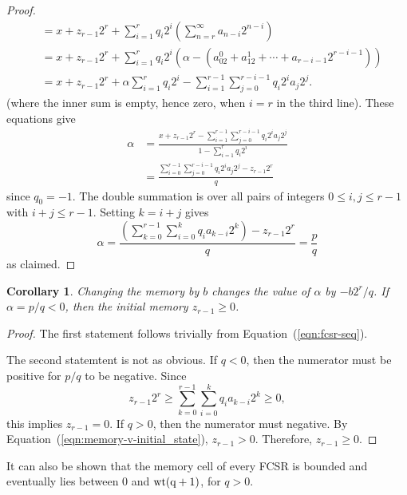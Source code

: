 \documentclass[english]{article}
\theoremstyle{plain}
\newtheorem{corollary}[theorem]{Corollary}%
\theoremstyle{definition}
\theoremstyle{remark}
\begin{document}
\begin{proof}
\begin{align*}
          &=x+z_{r-1}2^r+\sum_{i=1}^r{q_i2^i}\left(\sum_{n=r}^\infty a_{n-i}2^{n-i}\right)\\
          &=x+z_{r-1}2^r+\sum_{i=1}^r{q_i2^i}(\alpha-(a_02^0+a_12^1+\cdots+a_{r-i-1}2^{r-i-1}))\\
          &=x+z_{r-1}2^r+\alpha\sum_{i=1}^r{q_i2^i}-\sum_{i=1}^{r-1}\sum_{j=0}^{r-i-1}q_i2^ia_j2^j.
  \end{align*}
  (where the inner sum is empty, hence zero, when $i=r$ in the third line).
  These equations give
  \begin{align*}
    \alpha&=\frac{x+z_{r-1}2^r-\sum_{i=1}^{r-1}\sum_{j=0}^{r-i-1}q_i2^ia_j2^j}
                {1-\sum_{i=1}^r q_i2^i}\\
          &=\frac{\sum_{i=0}^{r-1}\sum_{j=0}^{r-i-1}q_i2^ia_j2^j-z_{r-1}2^r}{q}
  \end{align*}
  since $q_0=-1$. The double summation is over all pairs of integers $0\leq i,j
  \leq r-1$ with $i+j\leq r-1$. Setting $k=i+j$ gives
  \begin{equation}\label{eqn:fcsr-seq}
    \alpha=\frac{\left(\sum_{k=0}^{r-1}\sum_{i=0}^kq_ia_{k-i}2^k\right)-z_{r-1}2^r}{q}
          =\frac{p}{q}
  \end{equation}
  as claimed.
\end{proof}

\begin{corollary}
  \par Changing the memory by $b$ changes the value of $\alpha$ by $-b2^r/q$. If
  $\alpha=p/q<0$, then the initial memory $z_{r-1}\geq 0$.
\end{corollary}
\begin{proof}
  \par The first statement follows trivially from Equation~(\ref{eqn:fcsr-seq}).
  \par The second statemtent is not as obvious. If $q<0$, then the numerator
  must be positive for $p/q$ to be negative. Since
  \begin{equation}\label{eqn:memory-v-initial_state}
    z_{r-1}2^r\geq\sum_{k=0}^{r-1}\sum_{i=0}^kq_ia_{k-i}2^k\geq0,
  \end{equation}
  this implies $z_{r-1}=0$. If $q>0$, then the numerator must negative.
  By Equation~(\ref{eqn:memory-v-initial_state}), $z_{r-1}>0$. Therefore,
  $z_{r-1}\geq0$.
\end{proof}

\par It can also be shown that the memory cell of every FCSR is bounded and
eventually lies between 0 and ${\rm wt(q+1)}$, for $q>0$.
\end{document}
